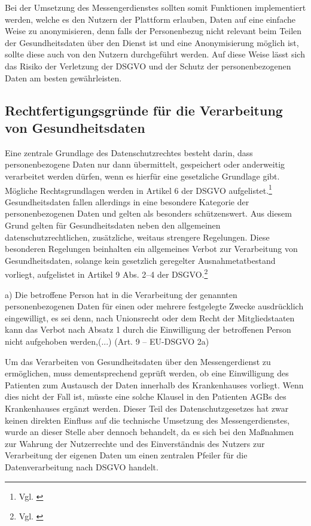 Bei der Umsetzung des Messengerdienstes sollten somit Funktionen implementiert werden, welche es den Nutzern der Plattform erlauben, Daten auf eine einfache Weise zu anonymisieren, denn falls der Personenbezug nicht relevant beim Teilen der Gesundheitsdaten über den Dienst ist und eine Anonymisierung möglich ist, sollte diese auch von den Nutzern durchgeführt werden. Auf diese Weise lässt sich das Risiko der Verletzung der DSGVO und der Schutz der personenbezogenen Daten am besten gewährleisten.

\subsection{Rechtfertigungsgründe für die Verarbeitung von Gesundheitsdaten}\label{subsection:rfdvvg}
Eine zentrale Grundlage des Datenschutzrechtes besteht darin, dass personenbezogene Daten nur dann übermittelt, gespeichert oder anderweitig verarbeitet werden dürfen, wenn es hierfür eine gesetzliche Grundlage gibt. Mögliche Rechtsgrundlagen werden in Artikel 6 der DSGVO aufgelistet.\footnote{Vgl. \cite[S. 5 f.]{Bundesaerztekammer2019}} Gesundheitsdaten fallen allerdings in eine besondere Kategorie der personenbezogenen Daten und gelten als besonders schützenswert. Aus diesem Grund gelten für Gesundheitsdaten neben den allgemeinen datenschutzrechtlichen, zusätzliche, weitaus strengere Regelungen. Diese besonderen Regelungen beinhalten ein allgemeines Verbot zur Verarbeitung von Gesundheitsdaten, solange kein gesetzlich geregelter Ausnahmetatbestand vorliegt, aufgelistet in Artikel 9 Abs. 2–4 der DSGVO.\footnote{Vgl. \cite[S. 20 ff.]{Bundesaerztekammer2019}}

\glqq a) Die betroffene Person hat in die Verarbeitung der genannten personenbezogenen Daten für einen oder mehrere festgelegte Zwecke ausdrücklich eingewilligt, es sei denn, nach Unionsrecht oder dem Recht der Mitgliedstaaten kann das Verbot nach Absatz 1 durch die Einwilligung der betroffenen Person nicht aufgehoben werden,(...)\grqq{} (Art. 9 – EU-DSGVO 2a)

Um das Verarbeiten von Gesundheitsdaten über den Messengerdienst zu ermöglichen, muss dementsprechend geprüft werden, ob eine Einwilligung des Patienten zum Austausch der Daten innerhalb des Krankenhauses vorliegt. Wenn dies nicht der Fall ist, müsste eine solche Klausel in den Patienten AGBs des Krankenhauses ergänzt werden. Dieser Teil des Datenschutzgesetzes hat zwar keinen direkten Einfluss auf die technische Umsetzung des Messengerdienstes, wurde an dieser Stelle aber dennoch behandelt, da es sich bei den Maßnahmen zur Wahrung der Nutzerrechte und des Einverständnis des Nutzers zur Verarbeitung der eigenen Daten um einen zentralen Pfeiler für die Datenverarbeitung nach DSGVO handelt.

